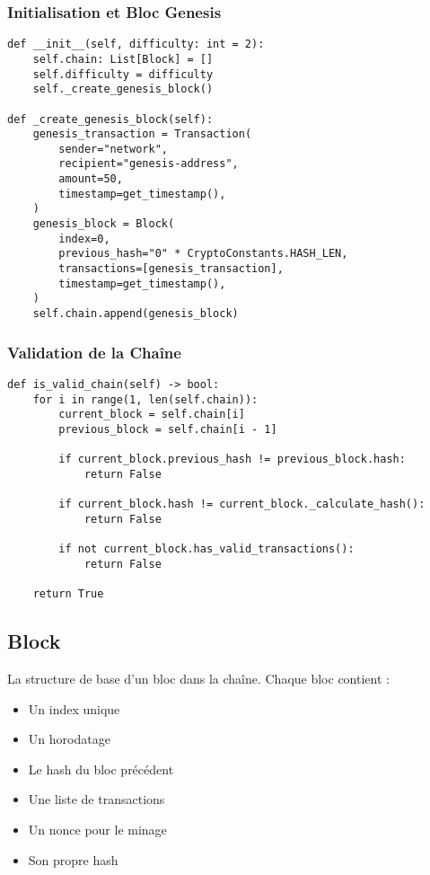 \documentclass[french]{article}
\begin{document}
\subsubsection{Initialisation et Bloc Genesis}
\begin{lstlisting}[style=python, caption=Initialisation de la Blockchain]
def __init__(self, difficulty: int = 2):
    self.chain: List[Block] = []
    self.difficulty = difficulty
    self._create_genesis_block()

def _create_genesis_block(self):
    genesis_transaction = Transaction(
        sender="network",
        recipient="genesis-address",
        amount=50,
        timestamp=get_timestamp(),
    )
    genesis_block = Block(
        index=0,
        previous_hash="0" * CryptoConstants.HASH_LEN,
        transactions=[genesis_transaction],
        timestamp=get_timestamp(),
    )
    self.chain.append(genesis_block)
\end{lstlisting}

\subsubsection{Validation de la Chaîne}
\begin{lstlisting}[style=python, caption=Validation de la Blockchain]
def is_valid_chain(self) -> bool:
    for i in range(1, len(self.chain)):
        current_block = self.chain[i]
        previous_block = self.chain[i - 1]

        if current_block.previous_hash != previous_block.hash:
            return False

        if current_block.hash != current_block._calculate_hash():
            return False

        if not current_block.has_valid_transactions():
            return False

    return True
\end{lstlisting}

\subsection{Block}
La structure de base d'un bloc dans la chaîne. Chaque bloc contient :
\begin{itemize}
    \item Un index unique
    \item Un horodatage
    \item Le hash du bloc précédent
    \item Une liste de transactions
    \item Un nonce pour le minage
    \item Son propre hash
\end{itemize}
\end{document}
